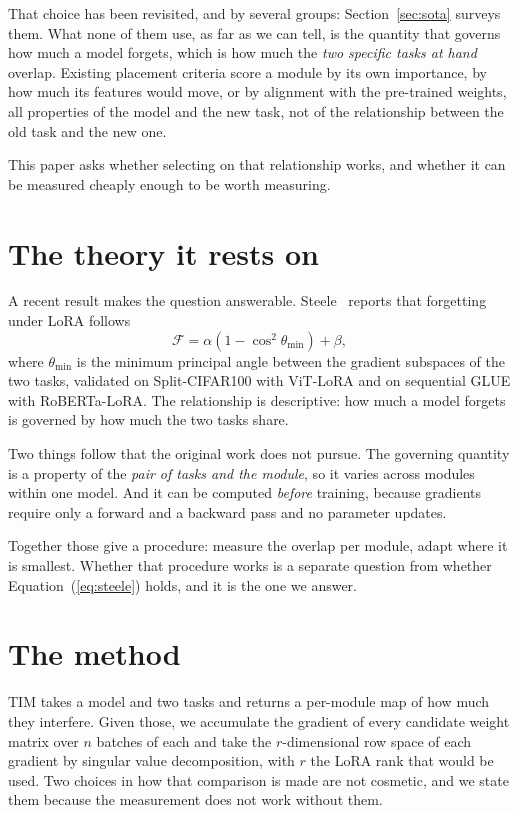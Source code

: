 \documentclass[11pt]{article}
\begin{document}
That choice has been revisited, and by several groups: Section~\ref{sec:sota}
surveys them. What none of them use, as far as we can tell, is the quantity that
governs how much a model forgets, which is how much the \emph{two specific tasks
at hand} overlap. Existing placement criteria score a module by its own
importance, by how much its features would move, or by alignment with the
pre-trained weights, all properties of the model and the new task, not of the
relationship between the old task and the new one.

This paper asks whether selecting on that relationship works, and whether it can
be measured cheaply enough to be worth measuring.

\section{The theory it rests on}

A recent result makes the question answerable. Steele~\cite{steele2026} reports
that forgetting under LoRA follows
\begin{equation}
\mathcal{F} = \alpha\left(1 - \cos^2\theta_{\min}\right) + \beta,
\label{eq:steele}
\end{equation}
where $\theta_{\min}$ is the minimum principal angle between the gradient
subspaces of the two tasks, validated on Split-CIFAR100 with ViT-LoRA and on
sequential GLUE with RoBERTa-LoRA. The relationship is descriptive: how much a
model forgets is governed by how much the two tasks share.

Two things follow that the original work does not pursue. The governing quantity
is a property of the \emph{pair of tasks and the module}, so it varies across
modules within one model. And it can be computed \emph{before} training, because
gradients require only a forward and a backward pass and no parameter updates.

Together those give a procedure: measure the overlap per module, adapt where it
is smallest. Whether that procedure works is a separate question from whether
Equation~(\ref{eq:steele}) holds, and it is the one we answer.

\section{The method}

TIM takes a model and two tasks and returns a per-module map of how much they
interfere. Given those, we accumulate the gradient of every candidate
weight matrix over $n$ batches of each and take the $r$-dimensional row space of
each gradient by singular value decomposition, with $r$ the LoRA rank that would
be used. Two choices in how that comparison is made are not cosmetic, and we
state them because the measurement does not work without them.
\end{document}
